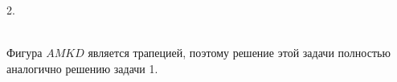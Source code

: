 2. \begin{figure}[ht!]
\end{figure}\\
Фигура $AMKD$ является трапецией, поэтому решение этой задачи полностью аналогично решению задачи 1.\\
